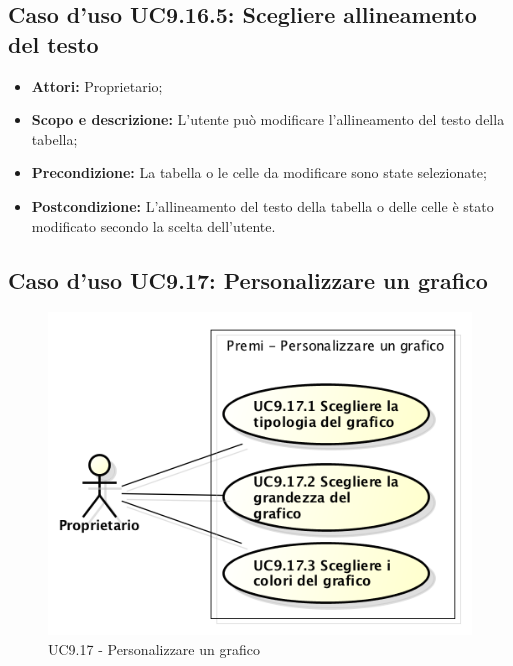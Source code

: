 	\subsection{Caso d'uso UC9.16.5: Scegliere allineamento del testo}
	\begin{itemize}
		\item \textbf{Attori:} Proprietario;
		\item \textbf{Scopo e descrizione:} L'utente può modificare l'allineamento del testo della tabella;
		\item \textbf{Precondizione:} La tabella o le celle da modificare sono state selezionate;
		\item \textbf{Postcondizione:} L'allineamento del testo della tabella o delle celle è stato modificato secondo la scelta dell'utente.
	\end{itemize}
	
	
	\subsection{Caso d'uso UC9.17: Personalizzare un grafico}
	\begin{figure}[h] 
		\centering 
		\includegraphics[scale=0.45] {img/UC9.17.png}
		\caption{UC9.17 - Personalizzare un grafico} 
	\end{figure}
	

